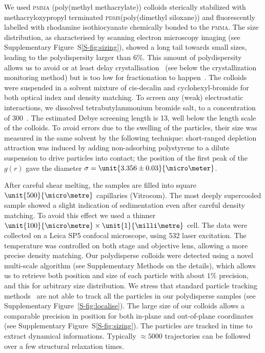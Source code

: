 We used \textsc{pmma} (poly(methyl methacrylate)) colloids sterically stabilized with methacryloxypropyl terminated \textsc{pdms}(poly(dimethyl siloxane)) and fluorescently labelled with rhodamine isothiocyanate chemically bonded to the \textsc{pmma}. The size distribution, as characterised by scanning electron microscopy imaging (see Supplementary Figure~S\ref{S-fig:sizing}), showed a long tail towards small sizes, leading to the polydispersity larger than 6\%. This amount of polydispersity allows us to avoid or at least delay crystallisation~\cite{Zaccarelli2009} (see below the crystallization monitoring method) but is too low for fractionation to happen~\citep{Fasolo2003}. The colloids were suspended in a solvent mixture of cis-decalin and cyclohexyl-bromide for both optical index and density matching. To screen any (weak) electrostatic interactions, we dissolved tetrabutylammonium bromide salt, to a concentration of \unit{300}{\nano\mole\per\liter}~\citep{royall2005}. The estimated Debye screening length is \unit{13}{\nano\metre}, well below the length scale of the colloids. To avoid errors due to the swelling of the particles, their size was measured in the same solvent by the following technique: short-ranged depletion attraction was induced by adding non-adsorbing polystyrene to a dilute suspension to drive particles into contact; the position of the first peak of the $g(r)$ gave the diameter $\sigma = \unit{3.356\pm0.03}{\micro\meter}$.

After careful shear melting, the samples are filled into square $\unit{500}{\micro\metre}$ capillaries (Vitrocom). The most deeply supercooled sample showed a slight indication of sedimentation even after careful density matching. To avoid this effect we used a thinner $\unit{100}{\micro\metre}\times\unit{1}{\milli\metre}$ cell. The data were collected on a Leica SP5 confocal microscope, using \unit{532}{\nano\meter} laser excitation. The temperature was controlled on both stage and objective lens, allowing a more precise density matching. Our polydisperse colloids were detected using a novel multi-scale algorithm (see Supplementary Methods on the details), which allows us to retrieve both position and size of each particle with about $1\%$ precision, and this for arbitrary size distribution. We stress that standard particle tracking methods~\cite{kegel2000swe, weeks2000} are not able to track all the particles in our polydisperse samples (see Supplementary Figure~\ref{S-fig:localise}). The large size of our colloids allows a comparable precision in position for both in-plane and out-of-plane coordinates (see Supplementary Figure~S\ref{S-fig:sizing}). The particles are tracked in time to extract dynamical informations. Typically $\approx 5000$ trajectories can be followed over a few structural relaxation times.

